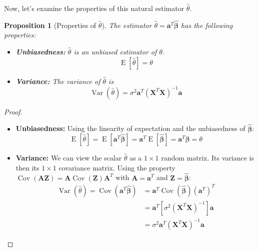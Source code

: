 \documentclass[11pt]{article}
\theoremstyle{mytheoremstyle}
\newtheorem{proposition}[theorem]{Proposition}
\theoremstyle{mydefinitionstyle}
\newcommand{\vect}[1]{\mathbf{#1}}
\DeclareMathOperator{\E}{E}
\DeclareMathOperator{\Var}{Var}
\DeclareMathOperator{\Cov}{Cov}
\begin{document}
Now, let's examine the properties of this natural estimator $\hat{\theta}$.

\begin{proposition}[Properties of $\hat{\theta}$]
The estimator $\hat{\theta} = \vect{a}^T \hat{\vect{\beta}}$ has the following properties:
\begin{itemize}
    \item \textbf{Unbiasedness:} $\hat{\theta}$ is an unbiased estimator of $\theta$.
        \begin{equation*}
        \E[\hat{\theta}] = \theta
        \end{equation*}
    \item \textbf{Variance:} The variance of $\hat{\theta}$ is
        \begin{equation*}
        \Var(\hat{\theta}) = \sigma^2 \vect{a}^T (\vect{X}^T \vect{X})^{-1} \vect{a}
        \end{equation*}
\end{itemize}
\end{proposition}

\begin{proof}
\begin{itemize}
    \item \textbf{Unbiasedness:} Using the linearity of expectation and the unbiasedness of $\hat{\vect{\beta}}$:
        \begin{equation*}
        \E[\hat{\theta}] = \E[\vect{a}^T \hat{\vect{\beta}}] = \vect{a}^T \E[\hat{\vect{\beta}}] = \vect{a}^T \vect{\beta} = \theta
        \end{equation*}
    \item \textbf{Variance:} We can view the scalar $\hat{\theta}$ as a $1 \times 1$ random matrix. Its variance is then its $1 \times 1$ covariance matrix. Using the property $\Cov(\vect{A}\vect{Z}) = \vect{A}\Cov(\vect{Z})\vect{A}^T$ with $\vect{A} = \vect{a}^T$ and $\vect{Z} = \hat{\vect{\beta}}$:
        \begin{align*}
        \Var(\hat{\theta}) = \Cov(\vect{a}^T \hat{\vect{\beta}}) &= \vect{a}^T \Cov(\hat{\vect{\beta}}) (\vect{a}^T)^T \\
        &= \vect{a}^T [\sigma^2 (\vect{X}^T \vect{X})^{-1}] \vect{a} \\
        &= \sigma^2 \vect{a}^T (\vect{X}^T \vect{X})^{-1} \vect{a}
        \end{align*}
\end{itemize}
\end{proof}
\end{document}

